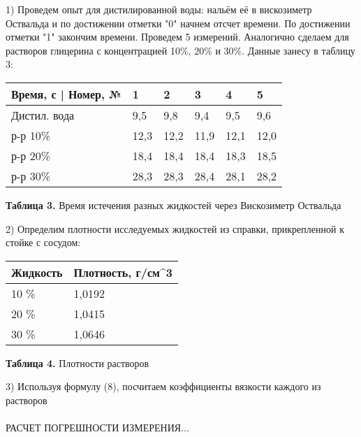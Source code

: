 \documentclass{article}
\begin{document}
1) Проведем опыт для дистилированной воды: нальём её в вискозиметр Оствальда и по достижении отметки "0" начнем отсчет времени. По достижении отметки "1" закончим времени. Проведем 5 измерений. Аналогично сделаем для растворов глицерина с концентрацией 10\%, 20\% и 30\%. Данные занесу в таблицу 3:

\begin{center}
    \begin{tabular}{|m{10em}|m{3em}|m{3em}|m{3em}|m{3em}|m{3em}|}
        \hline
        Время, с | Номер, №  & 1 & 2 & 3 & 4 & 5 \\
        \hline
        Дистил. вода & 9,5 & 9,8 & 9,4 & 9,5 & 9,6 \\
        \hline
        р-р 10\% & 12,3 & 12,2 & 11,9 & 12,1 & 12,0 \\
        \hline
        р-р 20\% & 18,4 & 18,4 & 18,4 & 18,3 & 18,5 \\
        \hline
        р-р 30\% & 28,3 & 28,3 & 28,4 & 28,1 & 28,2 \\
        \hline
    \end{tabular}
\end{center}

\begin{center}
    \textbf{Таблица 3.} Время истечения разных жидкостей через Вискозиметр Оствальда
\end{center}

2) Определим плотности исследуемых жидкостей из справки, прикрепленной к стойке с сосудом:

\begin{center}
    \begin{tabular}{|m{5em}|m{9em}|}
        \hline
        Жидкость & Плотность, г/см^3 \\
        \hline
        10 \% & 1,0192 \\
        \hline
        20 \% & 1,0415 \\
        \hline
        30 \% & 1,0646 \\
        \hline
    \end{tabular}
\end{center}
\begin{center}
    \textbf{Таблица 4.} Плотности растворов
\end{center}

3) Используя формулу (8), посчитаем коэффициенты вязкости каждого из растворов
\\
\\
РАСЧЕТ ПОГРЕШНОСТИ ИЗМЕРЕНИЯ...
\end{document}
